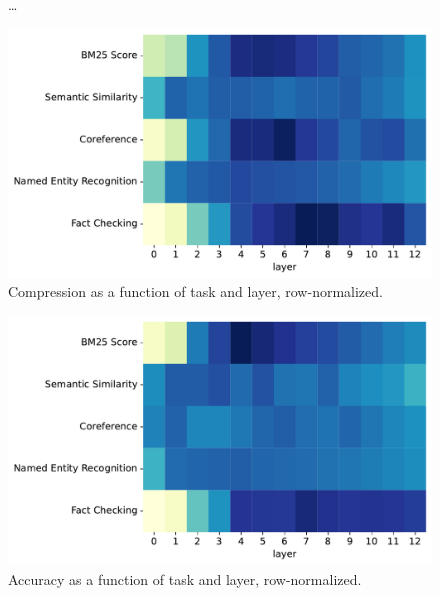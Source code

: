 \begin{figure}
    \centering
    \caption{\dots}
\end{figure}



\begin{figure}
    \centering
    \includegraphics[width=\textwidth]{gfx/probing/heatmap_compression}
    \caption{Compression as a function of task and layer, row-normalized.}
\end{figure}

\begin{figure}
    \centering
    \includegraphics[width=\textwidth]{gfx/probing/heatmap_accuracy}
    \caption{Accuracy as a function of task and layer, row-normalized.}
\end{figure}

